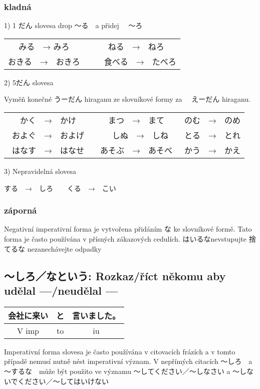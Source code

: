 \subsubsection{kladná}
1) 1 だん slovesa
drop 〜る　a přidej 　〜ろ
\begin{center}
\begin{tabular}{cc}
みる　→ みろ &　ねる　→　ねろ\\
おきる　→　おきろ &　　食べる　→　たべろ\\
\end{tabular}
\end{center}


2) 5だん slovesa

Vyměň konečné うーだん hiraganu ze slovníkové formy za 　えーだん hiraganu.
\begin{center}
\begin{tabular}{ccc}
かく　→　かけ　&まつ　→　まて　&のむ　→　のめ\\
およぐ　→　およげ &　しぬ　→　しね　&とる　→　とれ\\
はなす　→　はなせ　& あそぶ　→　あそべ　&かう　→　かえ\\
\end{tabular}
\end{center}


3) Nepravidelná slovesa

する　→　しろ　　くる　→　こい



\subsubsection{záporná}
Negativní imperativní forma je vytvořena přidáním な ke slovníkové formě. Tato forma je často používána v přísných zákazových cedulích.
はいるなnevstupujte
捨てるな nezanechávejte odpadky

\subsection{〜しろ／なという: Rozkaz/říct někomu aby udělal ---/neudělal ---}
\begin{center}
\begin{tabular}{||c|c||c||}
\hline
会社に来い&と&言いました。\\
\hline
V imp&to&iu\\
\hline
\end{tabular}
\end{center}

Imperativní forma slovesa je často používána v citovacích frázích a v tomto případě nemusí nutně nést imperativní význam. V nepřímých citacích 〜しろ　a 〜するな　může být použito ve významu 〜してください／〜しなさい a 〜しないでください／〜してはいけない 

